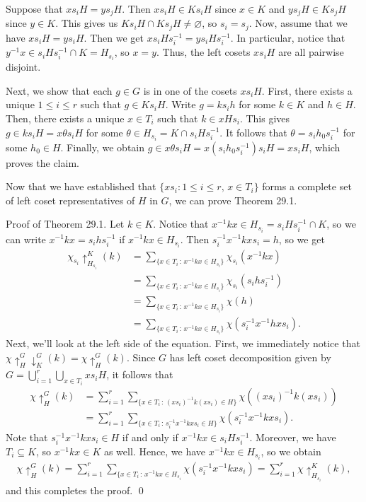 Suppose that $xs_iH = ys_jH$. Then $xs_iH \in Ks_iH$ since $x \in K$ and 
$ys_jH \in Ks_jH$ since $y \in K$. This gives us $Ks_iH \cap Ks_jH \neq 
\varnothing$, so $s_i = s_j$. Now, assume that we have $xs_iH = ys_iH$. 
Then we get $xs_iHs_i^{-1} = ys_iHs_i^{-1}$. In particular, notice that 
$y^{-1}x \in s_iHs_i^{-1} \cap K = H_{s_i}$, so $x = y$. Thus, the left cosets 
$xs_iH$ are all pairwise disjoint. 

Next, we show that each $g \in G$ is in one of the cosets $xs_iH$. 
First, there exists a unique $1 \leq i \leq r$ such that $g \in Ks_iH$. 
Write $g = ks_ih$ for some $k \in K$ and $h \in H$. Then, there exists a 
unique $x \in T_i$ such that $k \in xHs_i$. This gives $g \in ks_iH = 
x\theta s_iH$ for some $\theta \in H_{s_i} = K \cap s_iHs_i^{-1}$. 
It follows that $\theta = s_ih_0s_i^{-1}$ for some $h_0 \in H$. Finally, 
we obtain $g \in x\theta s_iH = x(s_ih_0s_i^{-1})s_i H = xs_i H$,
which proves the claim. 

Now that we have established that $\{xs_i : 1 \leq i \leq r,\,x\in T_i\}$ 
forms a complete set of left coset representatives of $H$ in $G$, 
we can prove Theorem 29.1. 

{\sc Proof of Theorem 29.1.} Let $k \in K$. Notice that 
$x^{-1}kx \in H_{s_i} = s_iHs_i^{-1} \cap K$, so we can write 
$x^{-1}kx = s_ihs_i^{-1}$ if $x^{-1}kx \in H_{s_i}$. Then $s_i^{-1}x^{-1}kxs_i 
= h$, so we get 
\begin{align*}
    \chi_{s_i} \uparrow_{H_{s_i}}^K (k) 
    &= \sum_{\{x\in T_i\,:\,x^{-1}kx\in H_{s_i}\}} \chi_{s_i}(x^{-1}kx) \\
    &= \sum_{\{x\in T_i\,:\,x^{-1}kx\in H_{s_i}\}} \chi_{s_i}(s_ihs_i^{-1}) \\  
    &= \sum_{\{x\in T_i\,:\,x^{-1}kx\in H_{s_i}\}} \chi(h) \\ 
    &= \sum_{\{x\in T_i\,:\,x^{-1}kx\in H_{s_i}\}} \chi(s_i^{-1}x^{-1}hxs_i).
\end{align*}
Next, we'll look at the left side of the equation. First, we immediately 
notice that $\chi \uparrow_H^G \downarrow_K^G (k) = \chi \uparrow_H^G (k)$. 
Since $G$ has left coset decomposition given by $G = \bigcup_{i=1}^r 
\bigcup_{x\in T_i} xs_i H$, it follows that 
\begin{align*}
    \chi \uparrow_H^G (k) 
    &= \sum_{i=1}^r \sum_{\{x\in T_i\,:\,(xs_i)^{-1}k(xs_i) \in H\}} \chi((xs_i)^{-1}k(xs_i)) \\
    &= \sum_{i=1}^r \sum_{\{x\in T_i\,:\,s_i^{-1}x^{-1}kxs_i \in H\}} \chi(s_i^{-1}x^{-1}kxs_i). 
\end{align*} 
Note that $s_i^{-1}x^{-1}kxs_i \in H$ if and only if $x^{-1}kx \in s_iHs_i^{-1}$. 
Moreover, we have $T_i \subseteq K$, so $x^{-1}kx \in K$ as well. 
Hence, we have $x^{-1}kx \in H_{s_i}$, so we obtain 
\begin{align*}
    \chi \uparrow_H^G (k) 
    = \sum_{i=1}^r \sum_{\{x\in T_i\,:\,x^{-1}kx \in H_{s_i}} \chi(s_i^{-1}x^{-1}kxs_i) 
    = \sum_{i=1}^r \chi \uparrow_{H_{s_i}}^K (k),
\end{align*}
and this completes the proof. \qed